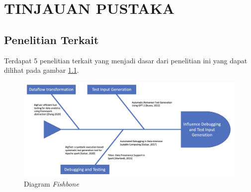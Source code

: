 \chapter{TINJAUAN PUSTAKA}
\label{chap:tinjauanpustaka}

\section{Penelitian Terkait}
\label{sec:penelitianterkait}

Terdapat 5 penelitian terkait yang menjadi dasar dari penelitian ini
yang dapat dilihat pada gambar \ref{fig:fishbone}.
\begin{figure}[H]
  \centering

  \includegraphics[scale=0.18]{gambar/StateOfTheArt.jpg}

  \caption{Diagram \emph{Fishbone}}
  \label{fig:fishbone}
\end{figure}

  

